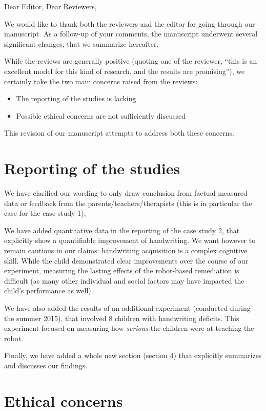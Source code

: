 \documentclass{article}
\begin{document}
Dear Editor, Dear Reviewers,

\vspace{2em}

We would like to thank both the reviewers and the editor for going through our
manuscript. As a follow-up of your comments, the manuscript underwent
several significant changes, that we summarize hereafter.

While the reviews are generally positive (quoting one of the reviewer, ``this
is an excellent model for this kind of research, and the results are
promising''), we certainly take the two main concerns raised from the reviews:

\begin{itemize}
    \item The reporting of the studies is lacking
    \item Possible ethical concerns are not sufficiently discussed
\end{itemize}

This revision of our manuscript attempts to address both these concerns.

\section*{Reporting of the studies}

We have clarified our wording to only draw conclusion from factual measured
data or feedback from the parents/teachers/therapists (this is in particular
the case for the case-study 1),

We have added quantitative data in the reporting of the case study 2, that
explicitly show a quantifiable improvement of handwriting. We want however to remain
cautious in our claims: handwriting acquisition is a complex cognitive skill.
While the child demonstrated clear improvements over the course of our
experiment, measuring the lasting effects of the robot-based remediation is
difficult (as many other individual and social factors may have impacted the
child's performance as well).

We have also added the results of an additional experiment (conducted during the
summer 2015), that involved 8 children with handwriting deficits. This
experiment focused on measuring how \emph{serious} the children were at
teaching the robot.

Finally, we have added a whole new section (section 4) that explicitly
summarizes and discusses our findings.

\section*{Ethical concerns}
\end{document}
